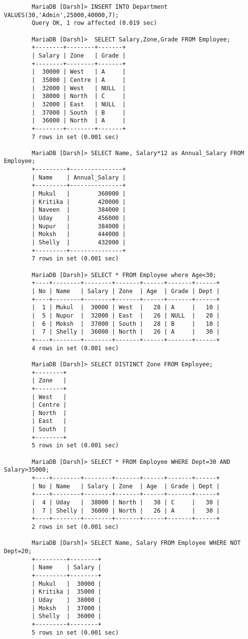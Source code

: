 \documentclass[
a4paper]{article}
\begin{document}
\begin{lstlisting}
		MariaDB [Darsh]> INSERT INTO Department VALUES(30,'Admin',25000,40000,7);
		Query OK, 1 row affected (0.019 sec)
		
		MariaDB [Darsh]>  SELECT Salary,Zone,Grade FROM Employee;
		+--------+--------+-------+
		| Salary | Zone   | Grade |
		+--------+--------+-------+
		|  30000 | West   | A     |
		|  35000 | Centre | A     |
		|  32000 | West   | NULL  |
		|  38000 | North  | C     |
		|  32000 | East   | NULL  |
		|  37000 | South  | B     |
		|  36000 | North  | A     |
		+--------+--------+-------+
		7 rows in set (0.001 sec)
		
		MariaDB [Darsh]> SELECT Name, Salary*12 as Annual_Salary FROM Employee;
		+---------+---------------+
		| Name    | Annual_Salary |
		+---------+---------------+
		| Mukul   |        360000 |
		| Kritika |        420000 |
		| Naveen  |        384000 |
		| Uday    |        456000 |
		| Nupur   |        384000 |
		| Moksh   |        444000 |
		| Shelly  |        432000 |
		+---------+---------------+
		7 rows in set (0.001 sec)
		
		MariaDB [Darsh]> SELECT * FROM Employee where Age<30;
		+----+--------+--------+-------+------+-------+------+
		| No | Name   | Salary | Zone  | Age  | Grade | Dept |
		+----+--------+--------+-------+------+-------+------+
		|  1 | Mukul  |  30000 | West  |   28 | A     |   10 |
		|  5 | Nupur  |  32000 | East  |   26 | NULL  |   20 |
		|  6 | Moksh  |  37000 | South |   28 | B     |   10 |
		|  7 | Shelly |  36000 | North |   26 | A     |   30 |
		+----+--------+--------+-------+------+-------+------+
		4 rows in set (0.001 sec)
		
		MariaDB [Darsh]> SELECT DISTINCT Zone FROM Employee;
		+--------+
		| Zone   |
		+--------+
		| West   |
		| Centre |
		| North  |
		| East   |
		| South  |
		+--------+
		5 rows in set (0.001 sec)
		
		MariaDB [Darsh]> SELECT * FROM Employee WHERE Dept=30 AND Salary>35000;
		+----+--------+--------+-------+------+-------+------+
		| No | Name   | Salary | Zone  | Age  | Grade | Dept |
		+----+--------+--------+-------+------+-------+------+
		|  4 | Uday   |  38000 | North |   38 | C     |   30 |
		|  7 | Shelly |  36000 | North |   26 | A     |   30 |
		+----+--------+--------+-------+------+-------+------+
		2 rows in set (0.001 sec)
		
		MariaDB [Darsh]> SELECT Name, Salary FROM Employee WHERE NOT Dept=20;
		+---------+--------+
		| Name    | Salary |
		+---------+--------+
		| Mukul   |  30000 |
		| Kritika |  35000 |
		| Uday    |  38000 |
		| Moksh   |  37000 |
		| Shelly  |  36000 |
		+---------+--------+
		5 rows in set (0.001 sec)
		

\end{lstlisting}
\end{document}
